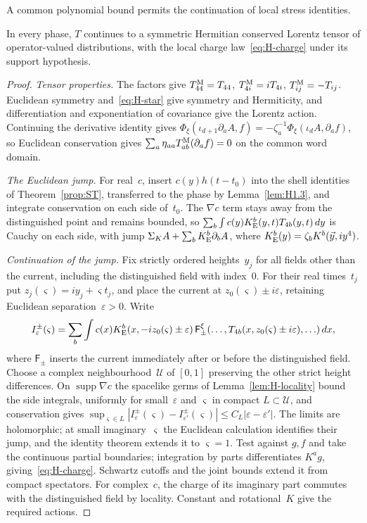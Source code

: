 A common polynomial bound permits the continuation of local stress identities.
\begin{lemma}\label{lem:H2.4}
In every phase, $T$ continues to a symmetric Hermitian conserved Lorentz tensor of operator-valued distributions, with the local charge law~\eqref{eq:H-charge} under its support hypothesis.
\end{lemma}
\begin{proof}
\emph{Tensor properties.} The factors give $T^{\rm M}_{44}=T_{44}$, $T^{\rm M}_{4i}=iT_{4i}$, $T^{\rm M}_{ij}=-T_{ij}$. Euclidean symmetry and~\eqref{eq:H-star} give symmetry and Hermiticity, and differentiation and exponentiation of covariance give the Lorentz action. Continuing the derivative identity gives $\Phi_\xi(\iota_{d+1}\partial_a A,f)=-\zeta_a^{-1}\Phi_\xi(\iota_dA,\partial_af)$, so Euclidean conservation gives $\sum_a\eta_{aa}T^{\rm M}_{ab}(\partial_af)=0$ on the common word domain.

\emph{The Euclidean jump.} For real~$c$, insert $c(y)h(t-t_0)$ into the shell identities of Theorem~\ref{prop:ST}, transferred to the phase by Lemma~\ref{lem:H1.3}, and integrate conservation on each side of~$t_0$. The $\nabla c$ term stays away from the distinguished point and remains bounded, so $\sum_b\int c(y)K_{\rm E}^b(y,t)T_{4b}(y,t)\,dy$ is Cauchy on each side, with jump $\Sigma_KA+\sum_bK_{\rm E}^b\partial_bA$, where $K_{\rm E}^b(y)=\zeta_bK^b(\vec y,iy^4)$.

\emph{Continuation of the jump.} Fix strictly ordered heights~$y_j$ for all fields other than the current, including the distinguished field with index~$0$. For their real times~$t_j$ put $z_j(\varsigma)=iy_j+\varsigma t_j$, and place the current at $z_0(\varsigma)\pm i\varepsilon$, retaining Euclidean separation~$\varepsilon>0$. Write
\begin{equation*}
I_\varepsilon^\pm(\varsigma)=\sum_b\int c(x)K_{\rm E}^b(x,-iz_0(\varsigma)\pm\varepsilon)
\,\mathsf F_{\pm}^\xi(\ldots,T_{4b}(x,z_0(\varsigma)\pm i\varepsilon),\ldots)\,dx,
\end{equation*}
where $\mathsf F_\pm$ inserts the current immediately after or before the distinguished field. Choose a complex neighbourhood~$\mathcal U$ of $[0,1]$ preserving the other strict height differences. On $\operatorname{supp}\nabla c$ the spacelike germs of Lemma~\ref{lem:H-locality} bound the side integrals, uniformly for small~$\varepsilon$ and $\varsigma$ in compact $L\subset\mathcal U$, and conservation gives $\sup_{\varsigma\in L}|I_\varepsilon^\pm(\varsigma)-I_{\varepsilon'}^\pm(\varsigma)|\le C_L|\varepsilon-\varepsilon'|$. The limits are holomorphic; at small imaginary~$\varsigma$ the Euclidean calculation identifies their jump, and the identity theorem extends it to $\varsigma=1$. Test against $g,f$ and take the continuous partial boundaries; integration by parts differentiates $K^ag$, giving~\eqref{eq:H-charge}. Schwartz cutoffs and the joint bounds extend it from compact spectators. For complex~$c$, the charge of its imaginary part commutes with the distinguished field by locality. Constant and rotational~$K$ give the required actions.
\end{proof}

